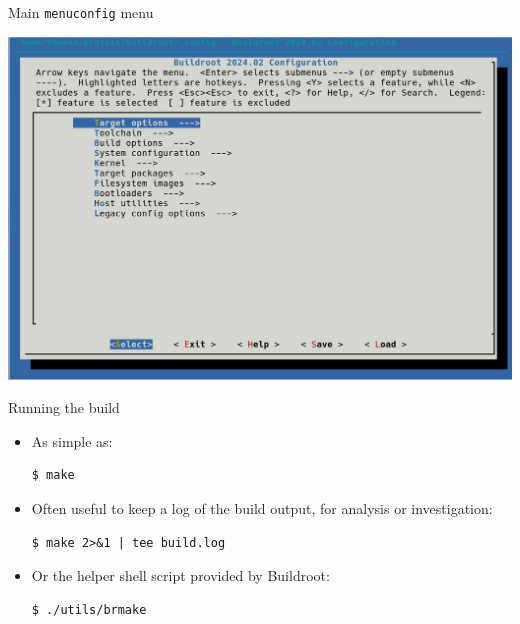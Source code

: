 \begin{frame}{Main {\tt menuconfig} menu}
  \begin{center}
    \includegraphics[height=0.8\textheight]{slides/buildroot-introduction/menuconfig.png}
  \end{center}
\end{frame}

\begin{frame}[fragile]{Running the build}
  \begin{itemize}
  \item As simple as:
    \begin{block}{}
\begin{verbatim}
$ make
\end{verbatim}
    \end{block}
  \item Often useful to keep a log of the build output, for analysis
    or investigation:
    \begin{block}{}
\begin{verbatim}
$ make 2>&1 | tee build.log
\end{verbatim}
    \end{block}
  \item Or the helper shell script provided by Buildroot:
    \begin{block}{}
\begin{verbatim}
$ ./utils/brmake
\end{verbatim}
    \end{block}
  \end{itemize}
\end{frame}

